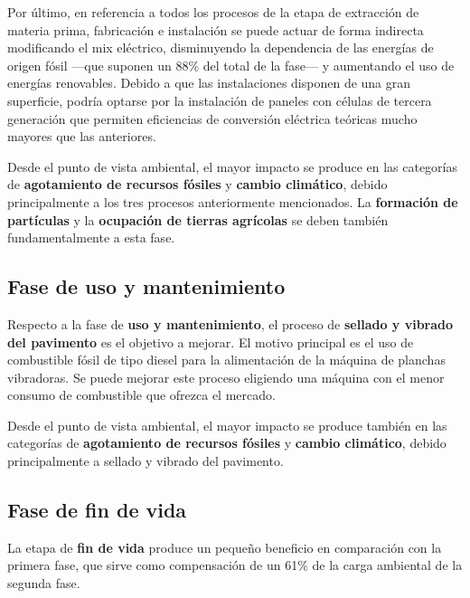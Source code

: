 Por último, en referencia a todos los procesos de la etapa de extracción de materia prima, fabricación e instalación se puede actuar de forma indirecta modificando el mix eléctrico, disminuyendo la dependencia de las energías de origen fósil —que suponen un 88\% del total de la fase— y aumentando el uso de energías renovables. Debido a que las instalaciones disponen de una gran superficie, podría optarse por la instalación de paneles con células de tercera generación que permiten eficiencias de conversión eléctrica teóricas mucho mayores que las anteriores.

Desde el punto de vista ambiental, el mayor impacto se produce en las categorías de \textbf{agotamiento de recursos fósiles} y \textbf{cambio climático}, debido principalmente a los tres procesos anteriormente mencionados. La \textbf{formación de partículas} y la \textbf{ocupación de tierras agrícolas} se deben también fundamentalmente a esta fase.

\subsection{Fase de uso y mantenimiento}
Respecto a la fase de \textbf{uso y mantenimiento}, el proceso de \textbf{sellado y vibrado del pavimento} es el objetivo a mejorar. El motivo principal es el uso de combustible fósil de tipo diesel para la alimentación de la máquina de planchas vibradoras. Se puede mejorar este proceso eligiendo una máquina con el menor consumo de combustible que ofrezca el mercado.

Desde el punto de vista ambiental, el mayor impacto se produce también en las categorías de \textbf{agotamiento de recursos fósiles} y \textbf{cambio climático}, debido principalmente a sellado y vibrado del pavimento.

\subsection{Fase de fin de vida}
La etapa de \textbf{fin de vida} produce un pequeño beneficio en comparación con la primera fase, que sirve como compensación de un 61\% de la carga ambiental de la segunda fase.
